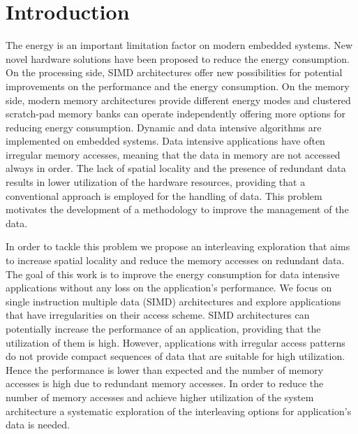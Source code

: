 \documentclass[prodmode,acmtodaes]{acmsmall}
\begin{document}

\maketitle

\section{Introduction}

The energy is an important limitation factor on modern embedded systems.
New novel hardware solutions have been proposed to reduce the energy consumption.
On the processing side, SIMD architectures offer new possibilities for potential improvements on the performance and the energy consumption.
On the memory side, modern memory architectures provide different energy modes and clustered scratch-pad memory banks can operate independently offering more options for reducing energy consumption.
Dynamic and data intensive algorithms are implemented on embedded systems.
Data intensive applications have often irregular memory accesses, meaning that the data in memory are not accessed always in order.
The lack of spatial locality and the presence of redundant data results in lower utilization of the hardware resources, providing that a conventional approach is employed for the handling of data.
This problem motivates the development of a methodology to improve the management of the data.

In order to tackle this problem we propose an interleaving exploration that aims to increase spatial locality and reduce the memory accesses on redundant data.
The goal of this work is to improve the energy consumption for data intensive applications without any loss on the application's performance. 
We focus on single instruction multiple data (SIMD) architectures and explore applications that have irregularities on their access scheme. 
SIMD architectures can potentially increase the performance of an application, providing that the utilization of them is high. 
However, applications with irregular access patterns do not provide compact sequences of data that are suitable for high utilization. 
Hence the performance is lower than expected and the number of memory accesses is high due to redundant memory accesses. 
In order to reduce the number of memory accesses and achieve higher utilization of the system architecture a systematic exploration of the interleaving options for application's data is needed. 
\end{document}
